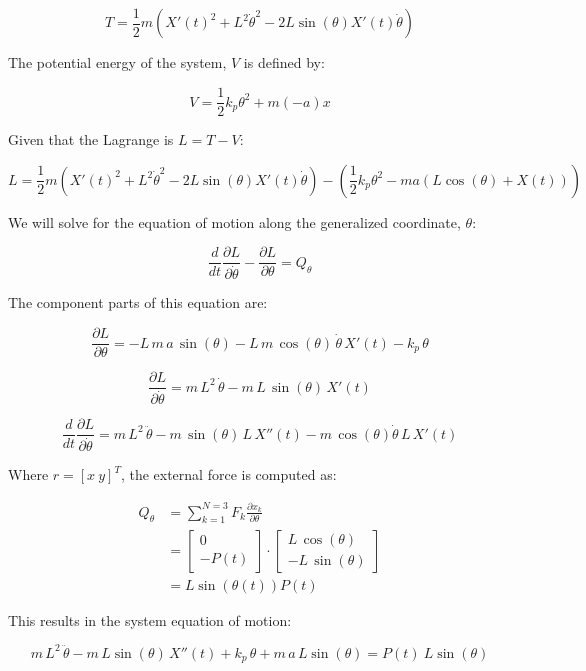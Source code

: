 \documentclass[12pt, letterpaper]{../assignment}
\begin{document}
$$ T = \frac{1}{2} m \left(X'(t)^2 + L^2\dot{\theta}^2 - 2 L \sin(\theta)X'(t)\dot{\theta}\right)  $$

The potential energy of the system, $V$ is defined by:

$$ V = \frac{1}{2} k_p \theta^2 + m (-a) x $$


Given that the Lagrange is $ L = T - V $:

$$ L = \frac{1}{2} m \left(X'(t)^2 + L^2\dot{\theta}^2 - 2 L \sin(\theta)X'(t)\dot{\theta}\right)- \left( \frac{1}{2} k_p \theta^2 - m a \left(L\cos(\theta)+X(t)\right) \right)$$

We will solve for the equation of motion along the generalized coordinate, $\theta$:

$$ \frac{d}{d t} \frac{\partial L}{\partial \dot{\theta}} - \frac{\partial L}{\partial \theta} = Q_\theta $$

The component parts of this equation are:

$$ \frac{\partial L}{\partial \theta} = 
-L\,m\,a\,\sin\left(\theta\right)-L\,m\,\cos\left(\theta\right)\,\dot{\theta}\,X'\left(t\right)-k_{p}\,\theta  $$

$$ \frac{\partial L}{\partial \dot{\theta}}  =
m\,L^2\,\dot{\theta}-m\,L\,\sin\left(\theta\right)\,X'\left(t\right) $$

$$ \frac{d}{d t} \frac{\partial L}{\partial \dot{\theta}} =
m\,L^2\,\ddot{\theta} - m\,\sin(\theta)\,L\,X''(t) - m\,\cos(\theta)\dot{\theta}\,L\,X'(t)  $$

Where $r = [x \ y]^T$, the external force is computed as:

\begin{equation*}
\begin{aligned}
Q_\theta &= \sum_{k=1}^{N=3} F_k \frac{\partial x_k }{\partial \theta}\\
&=\left[\begin{array}{r} 0\\ -P\left(t\right) \end{array}\right] \cdot \left[\begin{array}{r} L\,\cos\left(\theta \right)\\ -L\,\sin\left(\theta \right) \end{array}\right]\\
&= L\sin(\theta(t)) P(t)
\end{aligned}
\end{equation*}

This results in the system equation of motion:

$$ m\,L^2\,\ddot{\theta}-m\,L\sin\left(\theta\right)\,X''\left(t\right)+k_{p}\,\theta+m\,a\,L\sin\left(\theta\right) =  P(t)\ L \sin(\theta)   $$
\end{document}
